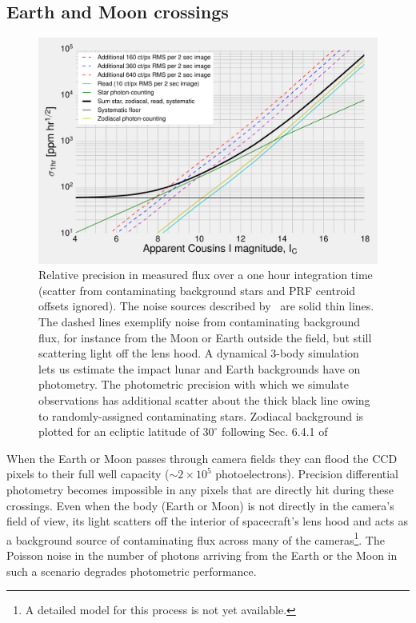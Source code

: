 \subsection{Earth and Moon crossings}
\label{sec:earth_moon_crossings}
\begin{figure}[!tb]
	\centering
	\includegraphics{figures/precision_memo.pdf}
	\caption{Relative precision in measured flux over a one hour integration time (scatter from contaminating background stars and PRF centroid offsets ignored). The noise sources described by~\protect\citet{Sullivan_2015} are solid thin lines. The dashed lines exemplify noise from contaminating background flux, for instance from the Moon or Earth outside the \tess field, but still scattering light off  the \tess lens hood. A dynamical 3-body simulation lets us estimate the impact  lunar and Earth backgrounds have on \tesss photometry.
	The photometric precision with which we simulate observations has additional scatter about the thick black line owing to randomly-assigned contaminating stars.
	Zodiacal background is plotted for an ecliptic latitude of $30^\circ$ following Sec. 6.4.1 of~\protect\citet{Sullivan_2015}}
	\label{fig:noise_with_moon}
\end{figure}

When the Earth or Moon passes through \tesss camera fields they can
flood the CCD pixels to their full well capacity ($\sim2\times10^5$
photoelectrons).  Precision differential photometry becomes impossible
in any pixels that are directly hit during these crossings.  Even when
the body (Earth or Moon) is not directly in the camera's field of
view, its light scatters off the interior of spacecraft's lens hood
and acts as a background source of contaminating flux across many of
the cameras\footnote{A detailed model for this process is not yet
  available.}.  
The Poisson noise in the number of photons
arriving from the Earth or the Moon in such a scenario degrades \tesss
photometric performance.   

